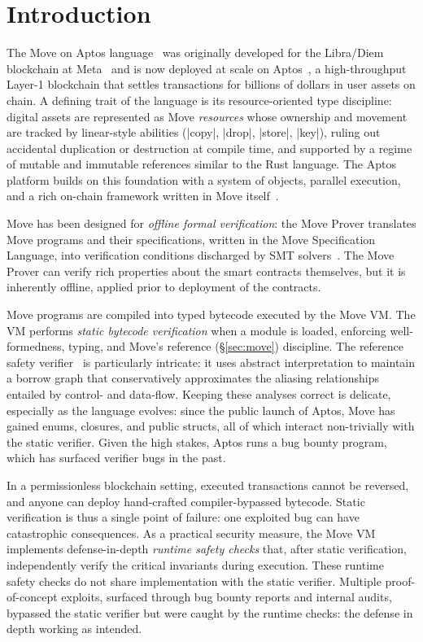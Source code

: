 \section{Introduction}
\label{sec:intro}

The Move on Aptos language~\cite{MoveOnAptosBook} was originally developed for the Libra/Diem blockchain at Meta~\cite{libra_blockchain_white,OLD_MOVE_LANG,blackshear2020resources} and is now deployed at scale on Aptos~\cite{Aptos}, a high-throughput Layer-1 blockchain that settles transactions for billions of dollars in user assets on chain.
A defining trait of the language is its resource-oriented type discipline: digital assets are represented as Move \emph{resources} whose ownership and movement are tracked by linear-style abilities (|copy|, |drop|, |store|, |key|), ruling out accidental duplication or destruction at compile time, and supported by a regime of mutable and immutable references similar to the Rust language.
The Aptos platform builds on this foundation with a system of objects, parallel execution, and a rich on-chain framework written in Move itself~\cite{TopoFrameworkBook,ParkZGXGCLC24}.

Move has been designed for \emph{offline formal verification}: the Move Prover translates Move programs and their specifications, written in the Move Specification Language, into verification conditions discharged by SMT solvers~\cite{DillGPQXZ22,GrieskampEtAl26HO}.
The Move Prover can verify rich properties about the smart contracts themselves, but it is inherently offline, applied prior to deployment of the contracts.

Move programs are compiled into typed bytecode executed by the Move VM.
The VM performs \emph{static bytecode verification} when a module is loaded, enforcing well-formedness, typing, and Move's reference (\S\ref{sec:move}) discipline.
The reference safety verifier~\cite{MoveBorrowChecker} is particularly intricate: it uses abstract interpretation to maintain a borrow graph that conservatively approximates the aliasing relationships entailed by control- and data-flow.
Keeping these analyses correct is delicate, especially as the language evolves: since the public launch of Aptos, Move has gained enums, closures, and public structs, all of which interact non-trivially with the static verifier.
Given the high stakes, Aptos runs a bug bounty program, which has surfaced verifier bugs in the past.

In a permissionless blockchain setting, executed transactions cannot be reversed, and anyone can deploy hand-crafted compiler-bypassed bytecode.
Static verification is thus a single point of failure: one exploited bug can have catastrophic consequences.
As a practical security measure, the Move VM implements defense-in-depth \emph{runtime safety checks} that, after static verification, independently verify the critical invariants during execution.
These runtime safety checks do not share implementation with the static verifier.
Multiple proof-of-concept exploits, surfaced through bug bounty reports and internal audits, bypassed the static verifier but were caught by the runtime checks: the defense in depth working as intended.


